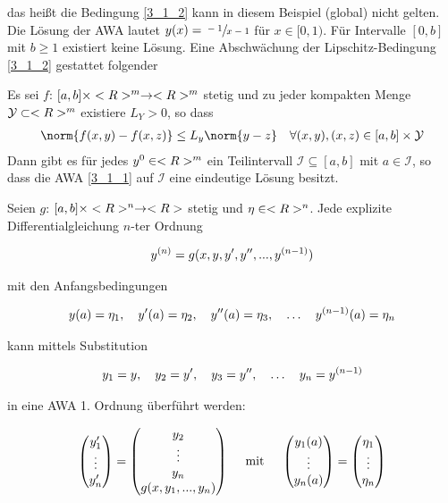 das heißt die Bedingung \cref{3_1_2} kann in diesem Beispiel (global) nicht gelten. Die Lösung der AWA lautet $y(x) = \sfrac{-1}{x-1}$ für $x \in [0,1)$. Für Intervalle $[0,b]$ mit $b \ge 1$ existiert keine Lösung. Eine Abschwächung der Lipschitz-Bedingung \cref{3_1_2} gestattet folgender

\begin{proposition}
	Es sei $f$: $[a,b] \times \R^m \to \R^m$ stetig und zu jeder kompakten Menge $\mathcal{Y} \subset \R^m$ existiere $L_Y > 0$, so dass
	\begin{align}
		\norm{f(x,y)-f(x,z)} \le L_y \norm{y-z} \quad \forall (x,y),(x,z) \in [a,b] \times \mathcal{Y} \notag
	\end{align}
	Dann gibt es für jedes $y^0 \in \R^m$ ein Teilintervall $\mathcal{I} \subseteq [a,b]$ mit $a \in \mathcal{I}$, so dass die AWA \cref{3_1_1} auf $\mathcal{I}$ eine eindeutige Lösung besitzt.
\end{proposition}

Seien $g$: $[a,b]\times \R^n \to \R$ stetig und $\eta \in \R^n$. Jede explizite Differentialgleichung $n$-ter Ordnung

\begin{align}
	y^{(n)} = g(x,y,y',y'',...,y^{(n-1)})\notag
\end{align}

mit den Anfangsbedingungen

\begin{align}
	y(a) = \eta_1, \quad y'(a) = \eta_2, \quad y''(a) = \eta_3, \quad \dots \quad y^{(n-1)}(a) = \eta_n\notag
\end{align}

kann mittels Substitution

\begin{align}
	y_1 = y,\quad y_2=y', \quad y_3=y'', \quad \dots \quad y_n = y^{(n-1)}\notag
\end{align}

in eine AWA 1. Ordnung überführt werden:

\begin{align}
	\begin{pmatrix}
		y_1' \\ \vdots \\ y_n'
	\end{pmatrix} = 
	\begin{pmatrix}
		y_2 \\ \vdots \\ y_n \\ g(x,y_1,...,y_n)
	\end{pmatrix} 
	\quad \mit \quad 
	\begin{pmatrix}
	y_1(a) \\ \vdots \\ y_n(a)
	\end{pmatrix} = 
	\begin{pmatrix}
	\eta_1 \\ \vdots \\ \eta_n
	\end{pmatrix} \notag
\end{align}